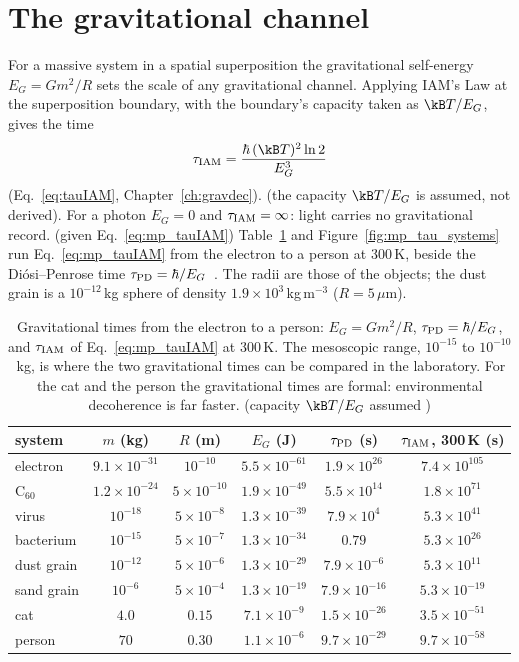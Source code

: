 \section{The gravitational channel}\label{sec:mp_gravity}
For a massive system in a spatial superposition the gravitational self-energy $E_G=Gm^2/R$ sets the scale of any gravitational channel. Applying IAM's
Law at the superposition boundary, with the boundary's capacity taken as $\kB T/E_G$, gives the time
\begin{equation}
\tau_{\rm IAM}=\frac{\hbar\,(\kB T)^2\ln2}{E_G^3}\label{eq:mp_tauIAM}
\end{equation}
(Eq.~\ref{eq:tauIAM}, Chapter~\ref{ch:gravdec}). \conjecture{} (the capacity $\kB T/E_G$ is assumed, not derived). For a photon $E_G=0$ and
$\tau_{\rm IAM}=\infty$: light carries no gravitational record. \derived{} (given Eq.~\ref{eq:mp_tauIAM}) Table~\ref{tab:mp_systems} and
Figure~\ref{fig:mp_tau_systems} run Eq.~\eqref{eq:mp_tauIAM} from the electron to a person at 300\,K, beside the Di\'osi--Penrose time
$\tau_{\rm PD}=\hbar/E_G$~\cite{Diosi1987,Penrose1996}. The radii are those of the objects; the dust grain is a $10^{-12}$\,kg sphere of density
$1.9\times10^3$\,kg\,m$^{-3}$ ($R=5\,\mu$m).

\begin{table}[htbp]\centering\small
\caption{Gravitational times from the electron to a person: $E_G=Gm^2/R$, $\tau_{\rm PD}=\hbar/E_G$, and $\tau_{\rm IAM}$ of Eq.~\eqref{eq:mp_tauIAM} at
300\,K. The mesoscopic range, $10^{-15}$ to $10^{-10}$\,kg, is where the two gravitational times can be compared in the laboratory. For the cat and the
person the gravitational times are formal: environmental decoherence is far faster. \calc{} (capacity $\kB T/E_G$ assumed \conjecture)}\label{tab:mp_systems}
\begin{tabular}{@{}lccccc@{}}\toprule
system & $m$ (kg) & $R$ (m) & $E_G$ (J) & $\tau_{\rm PD}$ (s) & $\tau_{\rm IAM}$, 300\,K (s)\\\midrule
electron & $9.1\times10^{-31}$ & $10^{-10}$ & $5.5\times10^{-61}$ & $1.9\times10^{26}$ & $7.4\times10^{105}$\\
C$_{60}$ & $1.2\times10^{-24}$ & $5\times10^{-10}$ & $1.9\times10^{-49}$ & $5.5\times10^{14}$ & $1.8\times10^{71}$\\
virus & $10^{-18}$ & $5\times10^{-8}$ & $1.3\times10^{-39}$ & $7.9\times10^{4}$ & $5.3\times10^{41}$\\
bacterium & $10^{-15}$ & $5\times10^{-7}$ & $1.3\times10^{-34}$ & $0.79$ & $5.3\times10^{26}$\\
dust grain & $10^{-12}$ & $5\times10^{-6}$ & $1.3\times10^{-29}$ & $7.9\times10^{-6}$ & $5.3\times10^{11}$\\
sand grain & $10^{-6}$ & $5\times10^{-4}$ & $1.3\times10^{-19}$ & $7.9\times10^{-16}$ & $5.3\times10^{-19}$\\
cat & $4.0$ & $0.15$ & $7.1\times10^{-9}$ & $1.5\times10^{-26}$ & $3.5\times10^{-51}$\\
person & $70$ & $0.30$ & $1.1\times10^{-6}$ & $9.7\times10^{-29}$ & $9.7\times10^{-58}$\\\bottomrule
\end{tabular}
\end{table}

